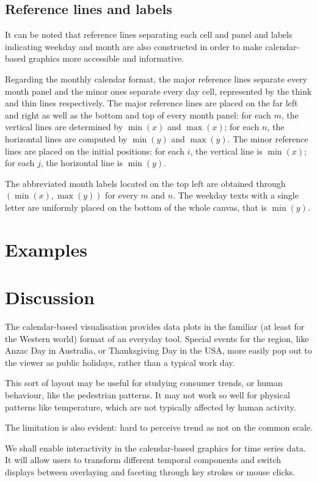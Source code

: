 \documentclass[article]{jss}
\begin{document}
\subsection{Reference lines and
labels}\label{reference-lines-and-labels}

It can be noted that reference lines separating each cell and panel and
labels indicating weekday and month are also constructed in order to
make calendar-based graphics more accessible and informative.

Regarding the monthly calendar format, the major reference lines
separate every month panel and the minor ones separate every day cell,
represented by the think and thin lines respectively. The major
reference lines are placed on the far left and right as well as the
bottom and top of every month panel: for each \(m\), the vertical lines
are determined by \(\min{(x)}\) and \(\max{(x)}\); for each \(n\), the
horizontal lines are computed by \(\min{(y)}\) and \(\max{(y)}\). The
minor reference lines are placed on the initial positions: for each
\(i\), the vertical line is \(\min{(x)}\); for each \(j\), the
horizontal line is \(\min{(y)}\).

The abbreviated month labels located on the top left are obtained
through \((\min{(x)}, \max{(y)})\) for every \(m\) and \(n\). The
weekday texts with a single letter are uniformly placed on the bottom of
the whole canvas, that is \(\min{(y)}\).

\section{Examples}\label{examples}

\label{sec:examples}

\section{Discussion}\label{discussion}

\label{sec:discussion}

The calendar-based visualisation provides data plots in the familiar (at
least for the Western world) format of an everyday tool. Special events
for the region, like Anzac Day in Australia, or Thanksgiving Day in the
USA, more easily pop out to the viewer as public holidays, rather than a
typical work day.

This sort of layout may be useful for studying consumer trends, or human
behaviour, like the pedestrian patterns. It may not work so well for
physical patterns like temperature, which are not typically affected by
human activity.

The limitation is also evident: hard to perceive trend as not on the
common scale.

We shall enable interactivity in the calendar-based graphics for time
series data. It will allow users to transform different temporal
components and switch displays between overlaying and faceting through
key strokes or mouse clicks.


\end{document}
